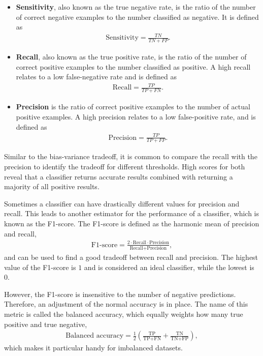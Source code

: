 \begin{itemize}
\item \textbf{Sensitivity}, also known as the true negative rate, is the ratio of the number of correct negative examples to the number classified as negative. It is defined as
\begin{align}
\text{Sensitivity} = \frac{TN}{TN + FP}.
\end{align}

\item \textbf{Recall}, also known as the true positive rate, is the ratio of the number of correct positive examples to the number classified as positive. A high recall relates to a low false-negative rate and is defined as
\begin{align}
\text{Recall} = \frac{TP}{TP + FN}.
\end{align}

\item \textbf{Precision} is the ratio of correct positive examples to the number of actual positive examples. A high precision relates to a low false-positive rate, and is defined as  \\
\begin{align}
\text{Precision} = \frac{TP}{TP + FP}.
\end{align}
\end{itemize} Similar to the bias-variance tradeoff, it is common to compare the recall with the precision to identify the tradeoff for different thresholds. High scores for both reveal that a classifier returns accurate results combined with returning a majority of all positive results.


Sometimes a classifier can have drastically different values for precision and recall. This leads to another estimator for the performance of a classifier, which is known as the F1-score. The F1-score is defined as the harmonic mean of precision and recall,
\begin{align}
\text{F1-score} = \frac{2\cdot \text{Recall} \cdot \text{Precision}}{\text{Recall} + \text{Precision}},
\end{align}
and can be used to find a good tradeoff between recall and precision. The highest value of the F1-score is $1$ and is considered an ideal classifier, while the lowest is $0$.

However, the F1-score is insensitive to the number of negative predictions. Therefore, an adjustment of the normal accuracy is in place. The name of this metric is called the balanced accuracy, which equally weights how many true positive and true negative,
\begin{align}
  \text{Balanced accuracy} = \frac{1}{2} \left( \frac{\text{TP}}{\text{TP} + \text{FN}} + \frac{\text{TN}}{\text{TN} + \text{FP}} \right),
\end{align}
which makes it particular handy for imbalanced datasets.

